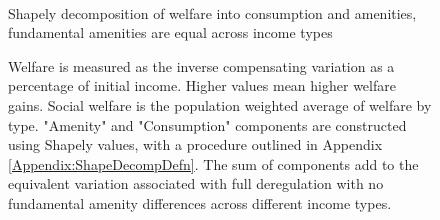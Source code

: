\documentclass[12pt]{article}
\begin{document}
	\begin{figure}[htbp!]
			\caption{ \\ Shapely decomposition of welfare into consumption and amenities, \\
					fundamental amenities are equal across income types}\label{figure:welfareDecompNoFund_ctfl}
					
				\caption*{Welfare is measured as the inverse compensating variation as a percentage of initial income. Higher values mean higher welfare gains. Social welfare is the population weighted average of welfare by type. "Amenity" and "Consumption" components are constructed using Shapely values, with a procedure outlined in Appendix \ref{Appendix:ShapeDecompDefn}. The sum of components add to the equivalent variation associated with full deregulation with no fundamental amenity differences across different income types.}
		
	\end{figure}
	
\end{document}
